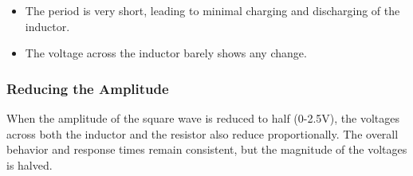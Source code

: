\begin{itemize}
    \item The period is very short, leading to minimal charging and discharging of the inductor.
    \item The voltage across the inductor barely shows any change.
\end{itemize}

\newpage{}
\thispagestyle{plain}

\subsubsection{Reducing the Amplitude}
When the amplitude of the square wave is reduced to half (0-2.5V), the voltages across both the inductor and the resistor also reduce proportionally. The overall behavior and response times remain consistent, but the magnitude of the voltages is halved.
